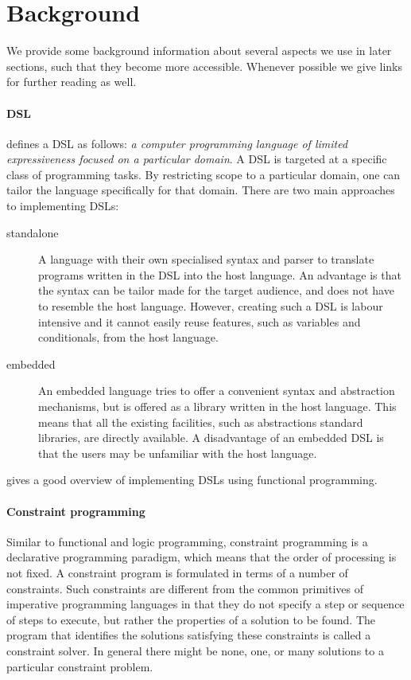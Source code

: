 \section{Background}
\label{sec:background}

We provide some background information about several aspects we use in
later sections, such that they become more accessible.
%
Whenever possible we give links for further reading as well.

\paragraph{\acl{DSL}} \citet{fowler} defines a \ac{DSL} as follows:
%
\emph{a computer programming language of limited expressiveness
  focused on a particular domain}.
%
A \ac{DSL} is targeted at a specific class of programming tasks.
%
By restricting scope to a particular domain, one can tailor the
language specifically for that domain.
%
There are two main approaches to implementing \acp{DSL}:
\begin{description}
\item[standalone] A language with their own specialised syntax and
  parser to translate programs written in the \ac{DSL} into the host
  language.
%
  An advantage is that the syntax can be tailor made for the target
  audience, and does not have to resemble the host language.
%
  However, creating such a \ac{DSL} is labour intensive and it cannot
  easily reuse features, such as variables and conditionals, from the
  host language.
\item[embedded] An embedded language tries to offer a convenient
  syntax and abstraction mechanisms, but is offered as a library
  written in the host language.
%
  This means that all the existing facilities, such as abstractions
  standard libraries, are directly available.
%
  A disadvantage of an embedded \ac{DSL} is that the users may be
  unfamiliar with the host language.
\end{description}
\citet{Gibbons2015} gives a good overview of implementing \acp{DSL}
using functional programming.

\paragraph{Constraint programming} Similar to functional and logic
programming, constraint programming is a declarative programming
paradigm, which means that the order of processing is not fixed.
%
A constraint program is formulated in terms of a number of
constraints.
%
Such constraints are different from the common primitives of
imperative programming languages in that they do not specify a step or
sequence of steps to execute, but rather the properties of a solution
to be found.
%
The program that identifies the solutions satisfying these constraints
is called a constraint solver.
%
In general there might be none, one, or many solutions to a particular
constraint problem.

